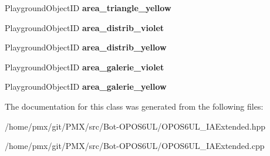 \begin{DoxyCompactItemize}
Playground\+Object\+ID {\bfseries area\+\_\+triangle\+\_\+yellow}
\item 
\mbox{\label{classOPOS6UL__IAExtended_aedf253360c24f011e7165663ad6eb753}} 
Playground\+Object\+ID {\bfseries area\+\_\+distrib\+\_\+violet}
\item 
\mbox{\label{classOPOS6UL__IAExtended_ab7c08475f6e7125529b4b7d376d6c62a}} 
Playground\+Object\+ID {\bfseries area\+\_\+distrib\+\_\+yellow}
\item 
\mbox{\label{classOPOS6UL__IAExtended_abfb250c01a324fd722071666ee60f7f3}} 
Playground\+Object\+ID {\bfseries area\+\_\+galerie\+\_\+violet}
\item 
\mbox{\label{classOPOS6UL__IAExtended_a077e9dfb2955543125c85a4f7e8b7e6e}} 
Playground\+Object\+ID {\bfseries area\+\_\+galerie\+\_\+yellow}
\end{DoxyCompactItemize}


The documentation for this class was generated from the following files\+:\begin{DoxyCompactItemize}
\item 
/home/pmx/git/\+P\+M\+X/src/\+Bot-\/\+O\+P\+O\+S6\+U\+L/O\+P\+O\+S6\+U\+L\+\_\+\+I\+A\+Extended.\+hpp\item 
/home/pmx/git/\+P\+M\+X/src/\+Bot-\/\+O\+P\+O\+S6\+U\+L/O\+P\+O\+S6\+U\+L\+\_\+\+I\+A\+Extended.\+cpp\end{DoxyCompactItemize}
